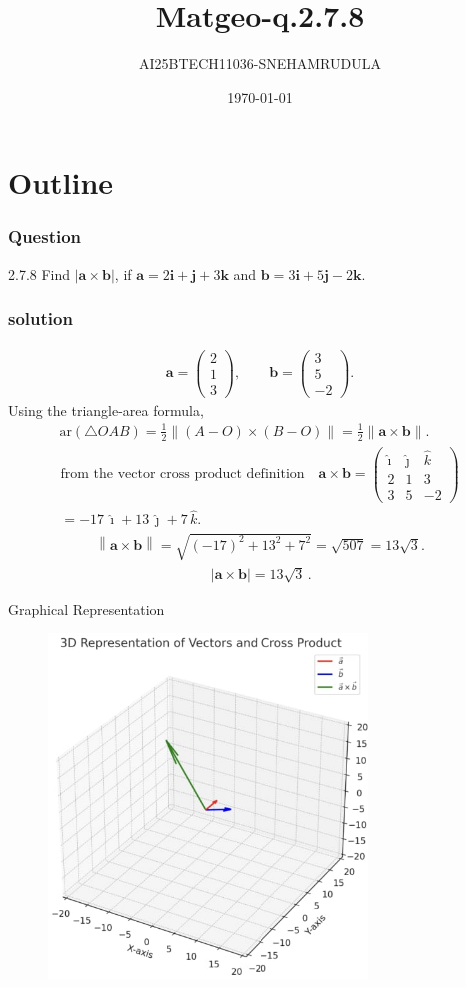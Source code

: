 \documentclass{beamer}
\title{Matgeo-q.2.7.8}
\author{AI25BTECH11036-SNEHAMRUDULA}
\date{\today}
\theoremstyle{remark}
\newcommand{\myvec}[1]{\ensuremath{\begin{pmatrix}#1\end{pmatrix}}}
\let\vec\mathbf
\begin{document}
\begin{frame}
\titlepage
\end{frame}

\section*{Outline}


\begin{frame}
\frametitle{Question}
2.7.8 Find $|\vec{a} \times \vec{b}|$, if 
$\vec{a} = 2\mathbf{i} + \mathbf{j} + 3\mathbf{k}$ and 
$\vec{b} = 3\mathbf{i} + 5\mathbf{j} - 2\mathbf{k}$.
\end{frame}
\begin{frame}
\frametitle{solution}

\begin{align}
\vec a=\myvec{2\\1\\3},\qquad
\vec b=\myvec{3\\5\\-2}.
\end{align}
Using the triangle-area formula,
\begin{align}
\text{ar}(\triangle OAB)=\frac12\|(A-O)\times(B-O)\|
=\frac12\|\vec a\times\vec b\|. \; \; \; \; \; \; \; \;
 \end{align}
\begin{align}
\text{from the vector cross product definition}\quad
\vec a\times\vec b=
\myvec{
\hat{\imath}&\hat{\jmath}&\hat{k}\\
2&1&3\\
3&5&-2
}
\\=-17\,\hat{\imath}+13\,\hat{\jmath}+7\,\hat{k}.
\end{align}
\begin{align}
\left\lVert\vec a\times\vec b\right\rVert
=\sqrt{(-17)^2+13^2+7^2}
=\sqrt{507}
=13\sqrt{3}.
\end{align}
\begin{align}
\boxed{\,|\vec a\times\vec b|=13\sqrt{3}\,}.
\end{align}

\end{frame}
    \begin{frame}{Graphical Representation}
   \begin{figure}[h!]
\centering
\includegraphics[width=0.6\linewidth]{fig2.7.8}

\end{figure}
\end{frame}
\end{document}
